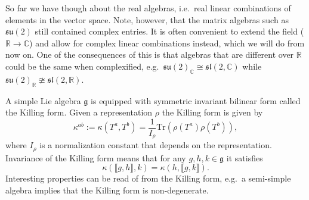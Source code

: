 So far we have though about the real algebras, i.e.\ real linear combinations of elements in the vector space. Note, however, that the matrix algebras such as $\mathfrak{su}(2)$ still contained complex entries. It is often convenient to extend the field ($\mathbb{R}\to\mathbb{C}$) and allow for complex linear combinations instead, which we will do from now on. One of the consequences of this is that algebras that are different over $\mathbb{R}$ could be the same when complexified, e.g.\ $\mathfrak{su}(2)_\mathbb{C}\cong \mathfrak{sl}(2,\mathbb{C})$ while $\mathfrak{su}(2)_\mathbb{R}\ncong\mathfrak{sl}(2,\mathbb{\mathbb{R}})$. 

A simple Lie algebra $\mathfrak{g}$ is equipped with symmetric invariant bilinear form called the Killing form. Given a representation $\rho$ the Killing form is given by 
\begin{equation}
    \kappa^{ab} := \kappa(T^a,T^b) =  \frac{1}{I_\rho}\text{Tr}\left(\rho(T^a)\rho(T^b)\right),
\end{equation}
where $I_\rho$ is a normalization constant that depends on the representation. Invariance of the Killing form means that for any $g,h,k\in\mathfrak{g}$ it satisfies 
\begin{equation}
    \kappa(\llbracket g,h\rrbracket,k) = \kappa(h,\llbracket g,k\rrbracket). 
\end{equation}
Interesting properties can be read of from the Killing form, e.g.\ a semi-simple algebra implies that the Killing form is non-degenerate. 


